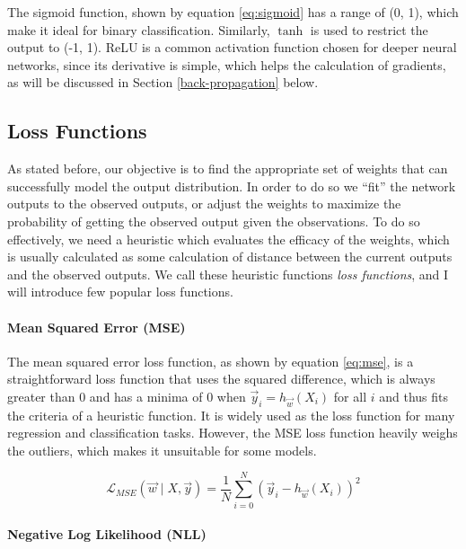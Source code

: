 \documentclass[12pt,a4paper,]{report}
\begin{document}
The sigmoid function, shown by equation \ref{eq:sigmoid} has a range of
(0, 1), which make it ideal for binary classification. Similarly,
\(\tanh\) is used to restrict the output to (-1, 1). ReLU is a common
activation function chosen for deeper neural networks, since its
derivative is simple, which helps the calculation of gradients, as will
be discussed in Section \ref{back-propagation} below.

\hypertarget{loss-functions}{%
\subsection{Loss Functions}\label{loss-functions}}

As stated before, our objective is to find the appropriate set of
weights that can successfully model the output distribution. In order to
do so we ``fit'' the network outputs to the observed outputs, or adjust
the weights to maximize the probability of getting the observed output
given the observations. To do so effectively, we need a heuristic which
evaluates the efficacy of the weights, which is usually calculated as
some calculation of distance between the current outputs and the
observed outputs. We call these heuristic functions \emph{loss
functions}, and I will introduce few popular loss functions.

\paragraph{Mean Squared Error (MSE)}

The mean squared error loss function, as shown by equation \ref{eq:mse},
is a straightforward loss function that uses the squared difference,
which is always greater than 0 and has a minima of 0 when
\(\vec{y}_i = h_{\vec{w}}(X_i)\) for all \(i\) and thus fits the
criteria of a heuristic function. It is widely used as the loss function
for many regression and classification tasks. However, the MSE loss
function heavily weighs the outliers, which makes it unsuitable for some
models.

\begin{equation}
    \mathcal{L}_{MSE}(\vec{w} \mid X, \vec{y}) = \frac{1}{N} \sum_{i = 0}^{N} (\vec{y}_i - h_{\vec{w}}(X_i))^2 \label{eq:mse}
\end{equation}

\paragraph{Negative Log Likelihood (NLL)}
\end{document}
